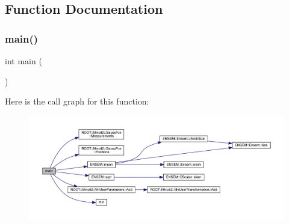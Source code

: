 \subsection{Function Documentation}
\mbox{\label{adat-devel_2other__libs_2minuit_2test_2MnSim_2PaulTest2_8cxx_ae66f6b31b5ad750f1fe042a706a4e3d4}} 
\subsubsection{\texorpdfstring{main()}{main()}}
{\footnotesize\ttfamily int main (\begin{DoxyParamCaption}{ }\end{DoxyParamCaption})}

Here is the call graph for this function\+:
\nopagebreak
\begin{figure}[H]
\begin{center}
\leavevmode
\includegraphics[width=350pt]{d1/d84/adat-devel_2other__libs_2minuit_2test_2MnSim_2PaulTest2_8cxx_ae66f6b31b5ad750f1fe042a706a4e3d4_cgraph}
\end{center}
\end{figure}

